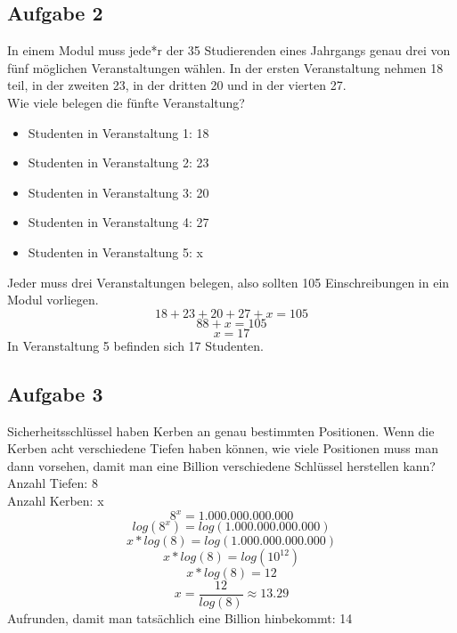 \documentclass{article} %
\begin{document}
\subsection{Aufgabe 2}
In einem Modul muss jede*r der 35 Studierenden eines Jahrgangs genau drei von fünf
möglichen Veranstaltungen wählen. In der ersten Veranstaltung nehmen 18 teil, in der
zweiten 23, in der dritten 20 und in der vierten 27.
\\ \newline
Wie viele belegen die fünfte Veranstaltung?
\\ 
\color{blue}
\begin{itemize}
    \item Studenten in Veranstaltung 1: 18 
    \item Studenten in Veranstaltung 2: 23
    \item Studenten in Veranstaltung 3: 20
    \item Studenten in Veranstaltung 4: 27 
    \item Studenten in Veranstaltung 5: x
\end{itemize}
Jeder muss drei Veranstaltungen belegen, also sollten 105 Einschreibungen in ein Modul vorliegen. 
\begin{equation*}
    18 + 23 + 20 + 27 + x = 105
\end{equation*}
\begin{equation*}
    88 + x = 105
\end{equation*}
\begin{equation*}
     x = 17
\end{equation*}
In Veranstaltung 5 befinden sich 17 Studenten.
\color{black}

\subsection{Aufgabe 3}
Sicherheitsschlüssel haben Kerben an genau bestimmten Positionen. Wenn die Kerben
acht verschiedene Tiefen haben können, wie viele Positionen muss man dann vorsehen,
damit man eine Billion verschiedene Schlüssel herstellen kann?
\color{blue}
Anzahl Tiefen: 8 \\
Anzahl Kerben: x \\
\begin{equation*}
    8^x = 1.000.000.000.000
\end{equation*}
\begin{equation*}
    log(8^x) = log(1.000.000.000.000)
\end{equation*}
\begin{equation*}
   x * log(8) = log(1.000.000.000.000)
\end{equation*}
\begin{equation*}
   x * log(8) = log(10^{12})
\end{equation*}
\begin{equation*}
   x * log(8) = 12
\end{equation*}
\begin{equation*}
   x  = \frac{12}{log(8)} \approx 13.29
\end{equation*}
Aufrunden, damit man tatsächlich eine Billion hinbekommt: 14
\color{black}
\end{document}
